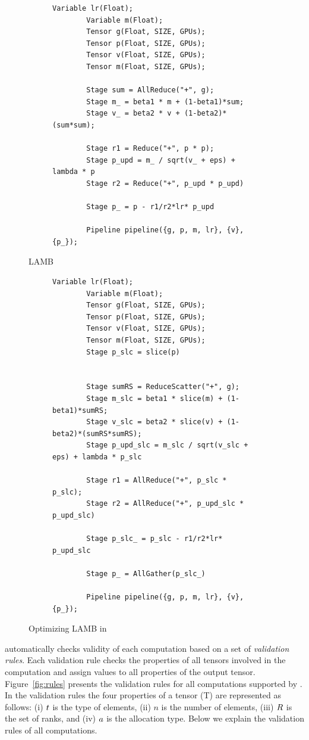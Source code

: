 \begin{figure}[t]
        \small
\begin{subfigure}{0.49\textwidth}
        \begin{lstlisting}[language=DSL]
        Variable lr(Float);
        Variable m(Float);
        Tensor g(Float, SIZE, GPUs);
        Tensor p(Float, SIZE, GPUs);
        Tensor v(Float, SIZE, GPUs);
        Tensor m(Float, SIZE, GPUs);
        
        Stage sum = AllReduce("+", g);
        Stage m_ = beta1 * m + (1-beta1)*sum;
        Stage v_ = beta2 * v + (1-beta2)*(sum*sum);

        Stage r1 = Reduce("+", p * p);
        Stage p_upd = m_ / sqrt(v_ + eps) + lambda * p
        Stage r2 = Reduce("+", p_upd * p_upd)

        Stage p_ = p - r1/r2*lr* p_upd
        
        Pipeline pipeline({g, p, m, lr}, {v}, {p_});
    \end{lstlisting}
\end{subfigure}
\caption{LAMB}

\begin{subfigure}{0.49\textwidth}
        \begin{lstlisting}[language=DSL]
        Variable lr(Float);
        Variable m(Float);
        Tensor g(Float, SIZE, GPUs);
        Tensor p(Float, SIZE, GPUs);
        Tensor v(Float, SIZE, GPUs);
        Tensor m(Float, SIZE, GPUs);
        Stage p_slc = slice(p)


        Stage sumRS = ReduceScatter("+", g);
        Stage m_slc = beta1 * slice(m) + (1-beta1)*sumRS;
        Stage v_slc = beta2 * slice(v) + (1-beta2)*(sumRS*sumRS);
        Stage p_upd_slc = m_slc / sqrt(v_slc + eps) + lambda * p_slc

        Stage r1 = AllReduce("+", p_slc * p_slc);
        Stage r2 = AllReduce("+", p_upd_slc * p_upd_slc)

        Stage p_slc_ = p_slc - r1/r2*lr* p_upd_slc

        Stage p_ = AllGather(p_slc_)

        Pipeline pipeline({g, p, m, lr}, {v}, {p_});
    \end{lstlisting}
\end{subfigure}

\caption{Optimizing LAMB in \tool }
        \label{fig:lamb}
\end{figure}

\tool automatically checks validity of each computation based on a set of \emph{validation rules}.
Each validation rule checks the properties of all tensors involved in the computation and assign values to all properties of the output tensor.
Figure~\ref{fig:rules} presents the validation rules for all computations supported by \tool.
In the validation rules the four properties of a tensor (T) are represented as follows: (i) $t{}$ is the type of elements, 
(ii) $n$ is the number of elements, (iii) $R{}$ is the set of ranks, and (iv) $a{}$ is the allocation type.
Below we explain the validation rules of all computations.


